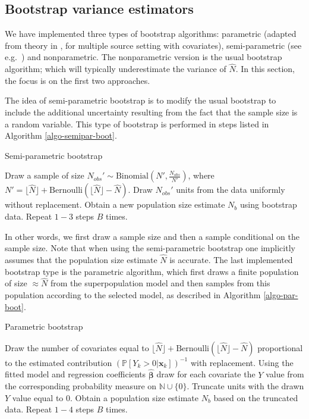 \documentclass[
]{jss}
\newcommand{\1}{\mathcal{I}} \newcommand{\bZero}{\boldsymbol{0}}
\begin{document}
\newpage

\subsection{Bootstrap variance estimators}\label{sec-boostrap}

We have implemented three types of bootstrap algorithms: parametric
(adapted from theory in \cite{zwane}, \cite{norrpoll} for multiple
source setting with covariates), semi-parametric (see
e.g.~\cite{BoehningFriedl2021}) and nonparametric. The nonparametric
version is the usual bootstrap algorithm; which will typically
underestimate the variance of \(\hat{N}\). In this section, the focus is
on the first two approaches.

The idea of semi-parametric bootstrap is to modify the usual bootstrap
to include the additional uncertainty resulting from the fact that the
sample size is a random variable. This type of bootstrap is performed in
steps listed in Algorithm \ref{algo-semipar-boot}.

\begin{algorithm}[ht!]
\small
\caption{Semi-parametric bootstrap}
\label{algo-semipar-boot}\DontPrintSemicolon
{} Draw a sample of size $N_{obs}'\sim\text{Binomial}\left(N', \frac{N_{obs}}{N'}\right)$, where $N'=\lfloor\hat{N}\rfloor+\text{Bernoulli}\left(\lfloor\hat{N}\rfloor-\hat{N}\right)$.\;
 Draw $N_{obs}'$ units from the data uniformly without replacement.\;
 Obtain a new population size estimate $N_b$ using bootstrap data.\;
 Repeat $1-3$ steps $B$ times.
\end{algorithm}

In other words, we first draw a sample size and then a sample
conditional on the sample size. Note that when using the semi-parametric
bootstrap one implicitly assumes that the population size estimate
\(\hat{N}\) is accurate. The last implemented bootstrap type is the
parametric algorithm, which first draws a finite population of size
\(\approx\hat{N}\) from the superpopulation model and then samples from
this population according to the selected model, as described in
Algorithm \ref{algo-par-boot}.

\begin{algorithm}[ht!]
\small
\caption{Parametric bootstrap}
\label{algo-par-boot}\DontPrintSemicolon
{} Draw the number of covariates equal to $\lfloor\hat{N}\rfloor+\text{Bernoulli}\left(\lfloor\hat{N}\rfloor-\hat{N}\right)$ proportional to the estimated contribution $(\mathbb{P}\left[Y_{k}>0|\boldsymbol{x}_{k}\right])^{-1}$ with replacement.\;
 Using the fitted model and regression coefficients $\hat{\boldsymbol{\beta}}$ draw for each covariate the $Y$ value from the corresponding probability measure on $\mathbb{N}\cup\{0\}$.\;
 Truncate units with the drawn $Y$ value equal to $0$.\;
 Obtain a population size estimate $N_b$ based on the truncated data.\;
 Repeat $1-4$ steps $B$ times.
\end{algorithm}
\end{document}
